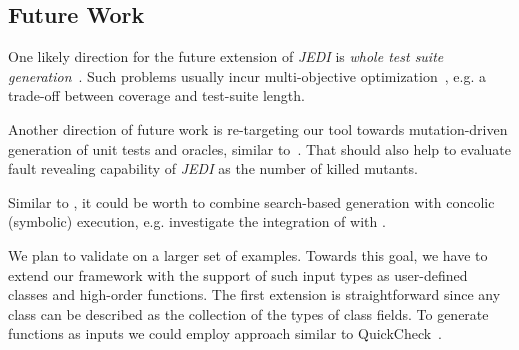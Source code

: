 
\subsection{Future Work}
\label{subsec.fut.work}

One likely direction for the future extension of \emph{JEDI} is \emph{whole test suite generation}~\cite{fraser2013whole}. Such problems usually incur multi-objective optimization~\cite{lakhotia2007multi,panichella2017lips}, e.g. a trade-off between coverage and test-suite length.

Another direction of future work is re-targeting our tool towards mutation-driven generation of unit tests and oracles, similar to~\cite{fraser2012mutation}. That should also help to evaluate fault revealing capability of \emph{JEDI} as the number of killed mutants.

Similar to \cite{baars2011symbolic, galeotti2013improving}, it could be worth to combine search-based generation with concolic (symbolic) execution, e.g. investigate the integration of \Jedi with \Jalangi.

We plan to validate \Jedi on a larger set of examples. Towards this goal, we have to extend our framework with the support of such input types as user-defined classes and high-order functions. The first extension is straightforward since any class can be described as the collection of the types of class fields. To generate functions as inputs we could employ approach similar to QuickCheck~\cite{koopman2006automatic}.


